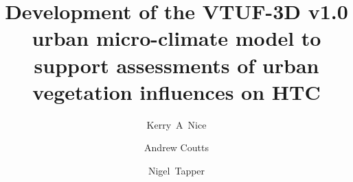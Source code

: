 \documentclass[final,3p,times,authoryear]{elsarticle}
\begin{document}
\begin{frontmatter}



\title{Development of the VTUF-3D v1.0 urban micro-climate model to support assessments of urban vegetation influences on HTC}


\author[monash,crc]{Kerry~A~Nice}
\author[monash,crc]{Andrew Coutts}
\author[monash,crc]{Nigel~Tapper}
\address[monash]{School of Earth, Atmosphere and Environment, Monash University, Clayton, VIC 3800, Australia}
\address[crc]{CRC for Water Sensitive Cities, Australia}


\begin{abstract}


\end{abstract}
\end{frontmatter}
\end{document}
